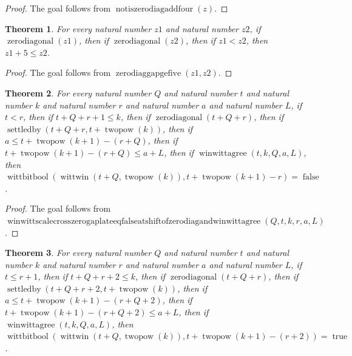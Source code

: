 \documentclass[11pt]{article}
\newtheorem{theorem}{Theorem}[section]
\theoremstyle{definition}
\begin{document}
\begin{proof}
The goal follows from \(\operatorname{notiszerodiagaddfour}(z)\).
\end{proof}
\begin{theorem}
\label{ll:paper:zero-diag-gap-ge-five}
For every natural number \(z1\) and natural number \(z2\), if \(\operatorname{zerodiagonal}(z1)\), then if \(\operatorname{zerodiagonal}(z2)\), then if \(z1 < z2\), then \(z1 + 5 \le z2\).
\end{theorem}
\begin{proof}
The goal follows from \(\operatorname{zerodiaggapgefive}(z1, z2)\).
\end{proof}
\begin{theorem}
\label{ll:paper:winwitt-scale-cross-zero-gap-late-eq-false-at-shift-of-zero-diag-and-winwittagree}
For every natural number \(Q\) and natural number \(t\) and natural number \(k\) and natural number \(r\) and natural number \(a\) and natural number \(L\), if \(t < r\), then if \(t + Q + r + 1 \le k\), then if \(\operatorname{zerodiagonal}(t + Q + r)\), then if \(\operatorname{settledby}(t + Q + r, t + \operatorname{twopow}(k))\), then if \(a \le t + \operatorname{twopow}(k + 1) - (r + Q)\), then if \(t + \operatorname{twopow}(k + 1) - (r + Q) \le a + L\), then if \(\operatorname{winwittagree}(t, k, Q, a, L)\), then \(\operatorname{wittbitbool}(\operatorname{wittwin}(t + Q, \operatorname{twopow}(k)), t + \operatorname{twopow}(k + 1) - r) = \operatorname{false}\).
\end{theorem}
\begin{proof}
The goal follows from \(\operatorname{winwittscalecrosszerogaplateeqfalseatshiftofzerodiagandwinwittagree}(Q, t, k, r, a, L)\).
\end{proof}
\begin{theorem}
\label{ll:paper:winwitt-scale-cross-zero-gap-late-eq-true-at-shift-after-zero-diag-and-winwittagree}
For every natural number \(Q\) and natural number \(t\) and natural number \(k\) and natural number \(r\) and natural number \(a\) and natural number \(L\), if \(t \le r + 1\), then if \(t + Q + r + 2 \le k\), then if \(\operatorname{zerodiagonal}(t + Q + r)\), then if \(\operatorname{settledby}(t + Q + r + 2, t + \operatorname{twopow}(k))\), then if \(a \le t + \operatorname{twopow}(k + 1) - (r + Q + 2)\), then if \(t + \operatorname{twopow}(k + 1) - (r + Q + 2) \le a + L\), then if \(\operatorname{winwittagree}(t, k, Q, a, L)\), then \(\operatorname{wittbitbool}(\operatorname{wittwin}(t + Q, \operatorname{twopow}(k)), t + \operatorname{twopow}(k + 1) - (r + 2)) = \operatorname{true}\).
\end{theorem}
\end{document}
